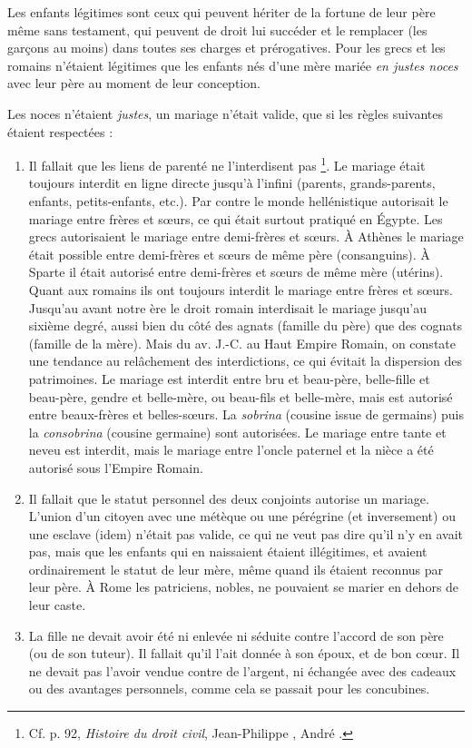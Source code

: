 Les enfants légitimes sont ceux qui peuvent hériter de la fortune
de leur père même sans testament, qui peuvent de droit lui succéder et le
remplacer (les garçons au moins) dans toutes ses charges et prérogatives.
Pour les grecs et les romains n'étaient légitimes que les enfants nés d'une
mère mariée \emph{en justes noces} avec leur père au moment de leur conception.

Les noces n'étaient \emph{justes}, un mariage n'était valide, que si les règles
suivantes étaient respectées :
\begin{enumerate}
\item Il
fallait que les liens de parenté ne l'interdisent pas%
\footnote{Cf. p. 92, \emph{Histoire du droit civil}, Jean-Philippe , André .}.
Le mariage
était toujours interdit en ligne directe jusqu'à l'infini (parents,
grands-parents, enfants, petits-enfants, etc.). Par contre le monde hellénistique
autorisait le mariage entre frères et sœurs, ce qui était surtout
pratiqué en Égypte. Les grecs autorisaient le mariage entre demi-frères et
sœurs. À Athènes le mariage était possible entre demi-frères et sœurs de
même père (consanguins). À Sparte il était autorisé entre demi-frères et
sœurs de même mère (utérins). Quant aux romains ils ont toujours interdit
le mariage entre frères et sœurs. Jusqu'au  avant notre
ère le droit romain interdisait le mariage jusqu'au sixième degré, aussi
bien du côté des agnats (famille du père) que des cognats (famille de la
mère). Mais du  av. J.-C. au Haut Empire Romain, on constate
une tendance au relâchement des interdictions, ce qui évitait la
dispersion des patrimoines. Le mariage est interdit entre bru et beau-père,
belle-fille et beau-père, gendre et belle-mère, ou beau-fils et belle-mère,
mais est autorisé entre beaux-frères et belles-sœurs. La \emph{sobrina}
(cousine issue de germains) puis la \emph{consobrina} (cousine germaine) sont
autorisées. Le mariage entre tante et neveu est interdit, mais le mariage
entre l'oncle paternel et la nièce a été autorisé sous l'Empire Romain.
\item Il fallait que le statut personnel des deux conjoints autorise un
mariage. L'union d'un citoyen avec une métèque ou une pérégrine (et inversement)
ou une esclave (idem) n'était pas valide, ce qui ne veut pas dire
qu'il n'y en avait pas, mais que les enfants qui en naissaient étaient illégitimes,
et avaient ordinairement le statut de leur mère, même quand ils
étaient reconnus par leur père. À Rome les patriciens, nobles, ne pouvaient
se marier en dehors de leur caste.
\item La fille ne devait avoir été ni enlevée ni séduite contre l'accord
de son père (ou de son tuteur). Il fallait qu'il l'ait donnée à son époux, et
de bon cœur. Il ne devait pas l'avoir vendue contre de l'argent, ni échangée
avec des cadeaux ou des avantages personnels, comme cela se passait
pour les concubines.
\end{enumerate}
